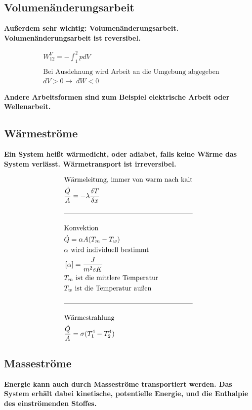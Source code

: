 \documentclass[12pt]{article}
\begin{document}
\subsection{Volumenänderungsarbeit}

\textbf{Außerdem sehr wichtig: Volumenänderungsarbeit.
Volumenänderungsarbeit ist reversibel.}
\begin{tcolorbox}[colback=backblue,colframe=borderblue,title=Important]
\begin{align*}
&W_{12} ^V = - \int _1 ^2 p dV \\ \\
&\text{Bei Ausdehnung wird Arbeit an die Umgebung abgegeben} \\
&dV > 0 \rightarrow \; dW <0
\end{align*}
\end{tcolorbox}

\textbf{Andere Arbeitsformen sind zum Beispiel elektrische Arbeit oder Wellenarbeit.}

\pagebreak
\subsection{Wärmeströme}
\bigskip
\textbf{Ein System heißt wärmedicht, oder adiabet, falls keine Wärme das System verlässt. Wärmetransport ist irreversibel.}

\begin{align*}
&\text{Wärmeleitung, immer von warm nach kalt} \\
&\frac{\dot{Q}}{A}=-\lambda \frac{\delta T}{\delta x} \\  \\
\hline \\
&\text{Konvektion} \\
&\dot{Q}=\alpha A (T_m - T_w) \\
&\alpha \text{ wird individuell bestimmt}  \\
&\left[\alpha\right]= \frac{J}{m^2 s K} \\
&\text{$T_m$ ist die mittlere Temperatur} \\
&\text{$T_w$ ist die Temperatur außen}\\ \\
\hline \\
&\text{Wärmestrahlung} \\
&\frac{\dot{Q}}{A}= \sigma(T_1^4 - T_2^4)
\end{align*}
\pagebreak
\subsection{Masseströme}
\bigskip
\textbf{Energie kann auch durch Masseströme transportiert werden. Das System erhält dabei kinetische, potentielle Energie, und die Enthalpie des einströmenden Stoffes.}
\end{document}

